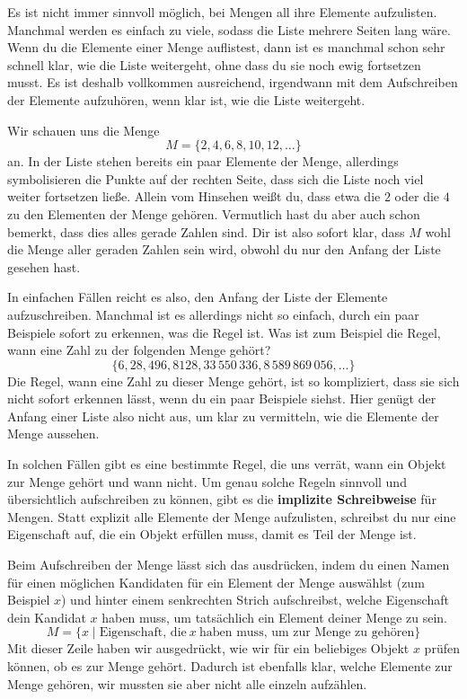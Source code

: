 \documentclass[../../main.tex]{subfiles}
\begin{document}
Es ist nicht immer sinnvoll möglich, bei Mengen all ihre Elemente aufzulisten. Manchmal werden es einfach zu viele, sodass die Liste mehrere Seiten lang wäre. Wenn du die Elemente einer Menge auflistest, dann ist es manchmal schon sehr schnell klar, wie die Liste weitergeht, ohne dass du sie noch ewig fortsetzen musst. Es ist deshalb vollkommen ausreichend, irgendwann mit dem Aufschreiben der Elemente aufzuhören, wenn klar ist, wie die Liste weitergeht.

\begin{example}{}
    Wir schauen uns die Menge
    \[M=\{2,4,6,8,10,12,\dots\}\]
    an. In der Liste stehen bereits ein paar Elemente der Menge, allerdings symbolisieren die Punkte auf der rechten Seite, dass sich die Liste noch viel weiter fortsetzen ließe. Allein vom Hinsehen weißt du, dass etwa die $2$ oder die $4$ zu den Elementen der Menge gehören. Vermutlich hast du aber auch schon bemerkt, dass dies alles gerade Zahlen sind. Dir ist also sofort klar, dass $M$ wohl die Menge aller geraden Zahlen sein wird, obwohl du nur den Anfang der Liste gesehen hast.
\end{example}

In einfachen Fällen reicht es also, den Anfang der Liste der Elemente aufzuschreiben. Manchmal ist es allerdings nicht so einfach, durch ein paar Beispiele sofort zu erkennen, was die Regel ist. Was ist zum Beispiel die Regel, wann eine Zahl zu der folgenden Menge gehört?
\[\{6,28,496,8128,33\,550\,336,8\,589\,869\,056,\dots\}\]
Die Regel, wann eine Zahl zu dieser Menge gehört, ist so kompliziert, dass sie sich nicht sofort erkennen lässt, wenn du ein paar Beispiele siehst. Hier genügt der Anfang einer Liste also nicht aus, um klar zu vermitteln, wie die Elemente der Menge aussehen.

In solchen Fällen gibt es eine bestimmte Regel, die uns verrät, wann ein Objekt zur Menge gehört und wann nicht. Um genau solche Regeln sinnvoll und übersichtlich aufschreiben zu können, gibt es die \textbf{implizite Schreibweise} für Mengen. Statt explizit alle Elemente der Menge aufzulisten, schreibst du nur eine Eigenschaft auf, die ein Objekt erfüllen muss, damit es Teil der Menge ist.

Beim Aufschreiben der Menge lässt sich das ausdrücken, indem du einen Namen für einen möglichen Kandidaten für ein Element der Menge auswählst (zum Beispiel $x$) und hinter einem senkrechten Strich aufschreibst, welche Eigenschaft dein Kandidat $x$ haben muss, um tatsächlich ein Element deiner Menge zu sein.
\[M=\{x\mid \text{Eigenschaft,~die}~x~\text{haben~muss,~um~zur~Menge~zu~gehören}\}\]
Mit dieser Zeile haben wir ausgedrückt, wie wir für ein beliebiges Objekt $x$ prüfen können, ob es zur Menge gehört. Dadurch ist ebenfalls klar, welche Elemente zur Menge gehören, wir mussten sie aber nicht alle einzeln aufzählen.
\end{document}
